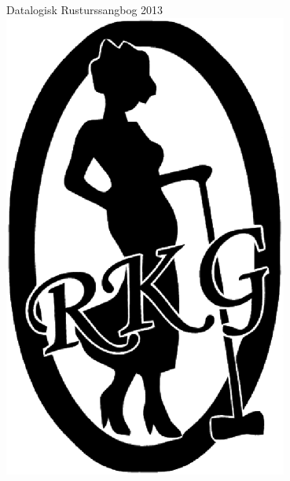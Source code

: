 \pagecolor{ProcessBlue}
\pagestyle{empty}
\begin{center}
  {\LARGE Datalogisk Rusturssangbog 2013}\\
  \includegraphics[width=0.7\textwidth]{logo.eps}
\end{center}

\newpage
\pagecolor{white}
